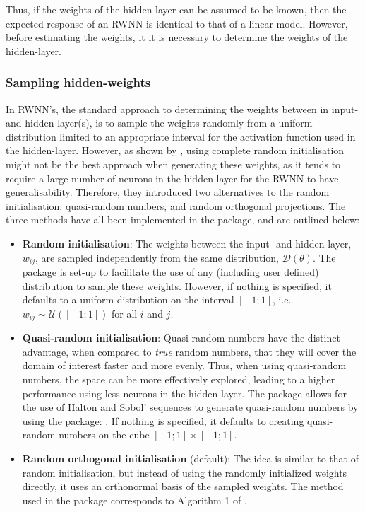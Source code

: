 \documentclass[
]{jss}
\providecommand{\tightlist}{%
  \setlength{\itemsep}{0pt}\setlength{\parskip}{0pt}}
\begin{document}
Thus, if the weights of the hidden-layer can be assumed to be known,
then the expected response of an RWNN is identical to that of a linear
model. However, before estimating the weights, it it is necessary to
determine the weights of the hidden-layer.

\hypertarget{HST}{%
\subsubsection{Sampling hidden-weights}\label{HST}}

In RWNN's, the standard approach to determining the weights between in
input- and hidden-layer(s), is to sample the weights randomly from a
uniform distribution limited to an appropriate interval for the
activation function used in the hidden-layer. However, as shown by
\citep{Wang2017}, using complete random initialisation might not be the
best approach when generating these weights, as it tends to require a
large number of neurons in the hidden-layer for the RWNN to have
generalisability. Therefore, they introduced two alternatives to the
random initialisation: quasi-random numbers, and random orthogonal
projections. The three methods have all been implemented in the
 package, and are outlined below:

\begin{itemize}
\tightlist
\item
  \textbf{Random initialisation}: The weights between the input- and
  hidden-layer, \(w_{ij}\), are sampled independently from the same
  distribution, \(\mathcal D(\theta)\). The  package is set-up
  to facilitate the use of any (including user defined) distribution to
  sample these weights. However, if nothing is specified, it defaults to
  a uniform distribution on the interval \([-1;1]\),
  i.e.~\(w_{ij}\sim\mathcal U([-1;1])\) for all \(i\) and \(j\).
\item
  \textbf{Quasi-random initialisation}: Quasi-random numbers have the
  distinct advantage, when compared to \emph{true} random numbers, that
  they will cover the domain of interest faster and more evenly. Thus,
  when using quasi-random numbers, the space can be more effectively
  explored, leading to a higher performance using less neurons in the
  hidden-layer. The  package allows for the use of Halton and
  Sobol' sequences to generate quasi-random numbers by using the
   package:  \citep{randtoolbox}. If
  nothing is specified, it defaults to creating quasi-random numbers on
  the cube \([-1;1] \times [-1;1]\).
\item
  \textbf{Random orthogonal initialisation} (default): The idea is
  similar to that of random initialisation, but instead of using the
  randomly initialized weights directly, it uses an orthonormal basis of
  the sampled weights. The method used in the  package
  corresponds to Algorithm 1 of \citep{Wang2017}.
\end{itemize}
\end{document}
